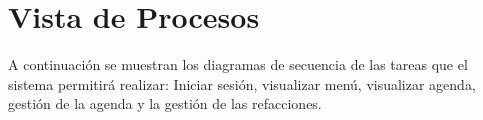 \section{Vista de Procesos}
A continuación se muestran los diagramas de secuencia de las tareas que el sistema permitirá realizar: Iniciar sesión, visualizar menú, visualizar agenda, gestión de la agenda y la gestión de las refacciones. 

\vspace{2.5cm}









